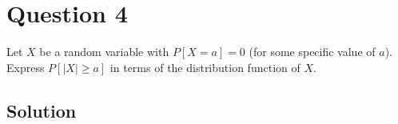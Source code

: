 \section*{Question 4}

Let \( X \) be a random variable with \( P[X=a]=0 \) (for some specific value of \( a \)).
Express \( P[|X| \geq a] \) in terms of the distribution function of \( X \).

\subsection*{Solution}

